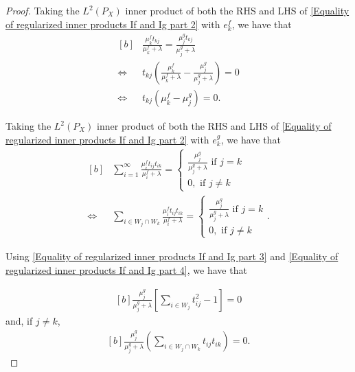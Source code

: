 \documentclass{article}
\theoremstyle{plain}
\newcommand{\LPtwo}{L^{2}(P_{X})}
\begin{document}
\begin{proof}
    Taking the $\LPtwo$ inner product of both the RHS and LHS of \eqref{Equality of regularized inner products If and Ig part 2} with $e_{k}^{f}$, we have that
    \begin{equation}\label{Equality of regularized inner products If and Ig part 3}
        \begin{aligned}[b]
            &\frac{\mu_{k}^{f}t_{kj}}{\mu_{k}^{f} + \lambda} = \frac{\mu_{j}^{g}t_{kj}}{\mu_{j}^{g} + \lambda} \\
            \iff & t_{kj} \left(\frac{\mu_{k}^{f}}{\mu_{k}^{f} + \lambda} - \frac{\mu_{j}^{g}}{\mu_{j}^{g} + \lambda}  \right) = 0\\
            \iff & t_{kj} \left( \mu_{k}^{f} - \mu_{j}^{g}\right) = 0 .
        \end{aligned}
    \end{equation}

    Taking the $\LPtwo$ inner product of both the RHS and LHS of \eqref{Equality of regularized inner products If and Ig part 2} with $e_{k}^{g}$, we have that
    \begin{equation}\label{Equality of regularized inner products If and Ig part 4}
        \begin{aligned}[b]
        & \sum_{i=1}^{\infty} \frac{\mu_{i}^{f}t_{ij}t_{ik}}{\mu_{i}^{f} + \lambda} = \begin{cases}
            \frac{\mu_{j}^{g}}{\mu_{j}^{g} + \lambda} \textrm{ if } j = k \\
            0, \textrm{ if } j \neq k
        \end{cases} \\
        \iff & \sum_{i \in W_{j} \cap W_{k}}\frac{\mu_{i}^{f}t_{ij}t_{ik}}{\mu_{i}^{f} + \lambda} = \begin{cases}
            \frac{\mu_{j}^{g}}{\mu_{j}^{g} + \lambda} \textrm{ if } j = k \\
            0, \textrm{ if } j \neq k
        \end{cases}.
        \end{aligned}
    \end{equation}

    Using \eqref{Equality of regularized inner products If and Ig part 3} and \eqref{Equality of regularized inner products If and Ig part 4}, we have that

    \begin{equation}\label{Equality of regularized inner products If and Ig part 5}
        \begin{aligned}[b]
        \frac{\mu_{j}^{g}}{\mu_{j}^{g} + \lambda} \left[ \sum_{i \in W_{j}}t_{ij}^{2} - 1\right] = 0
        \end{aligned}
    \end{equation}
    and, if $j \neq k$,
    \begin{equation}\label{Equality of regularized inner products If and Ig part 6}
        \begin{aligned}[b]
        \frac{\mu_{j}^{g}}{\mu_{j}^{g} + \lambda} \left( \sum_{i \in W_{j}\cap W_{k}}t_{ij}t_{ik}\right) = 0.
        \end{aligned}
    \end{equation}


\end{proof}
\end{document}
